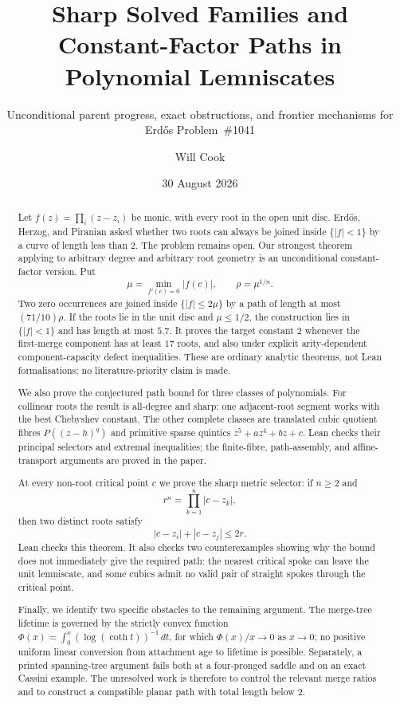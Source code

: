\documentclass[11pt]{article}
\title{Sharp Solved Families and\\Constant-Factor Paths in Polynomial Lemniscates}
\subtitle{Unconditional parent progress, exact obstructions, and frontier
mechanisms for Erd\H{o}s Problem~\#1041}
\author{Will Cook}
\date{30 August 2026}
\begin{document}
\maketitle
\noteprovenance

\begin{abstract}
\noindent
Let $f(z)=\prod_i(z-z_i)$ be monic, with every root in the open unit disc.
Erd\H{o}s, Herzog, and Piranian asked whether two roots can always be joined
inside $\{|f|<1\}$ by a curve of length less than $2$.  The problem remains
open.  Our strongest theorem applying to arbitrary degree and arbitrary root
geometry is an unconditional constant-factor version.  Put
\[
 \mu=\min_{f'(c)=0}|f(c)|,\qquad \rho=\mu^{1/n}.
\]
Two zero occurrences are joined inside $\{|f|\le2\mu\}$ by a path of length
at most $(71/10)\rho$.  If the roots lie in the unit disc and $\mu\le1/2$,
the construction lies in $\{|f|<1\}$ and has length at most $5.7$.
It proves the target constant $2$ whenever the first-merge component has at
least $17$ roots, and also under explicit arity-dependent component-capacity
defect inequalities.  These are ordinary analytic theorems, not Lean
formalisations; no literature-priority claim is made.

We also prove the conjectured path bound for three classes of polynomials.
For collinear roots the result is all-degree and sharp: one adjacent-root
segment works with the best Chebyshev constant.  The other complete classes
are translated cubic quotient fibres $P((z-h)^q)$ and primitive sparse
quintics $z^5+az^4+bz+c$.  Lean checks their principal selectors and extremal
inequalities; the finite-fibre, path-assembly, and affine-transport arguments
are proved in the paper.

At every non-root critical point $c$ we prove the sharp metric selector: if
$n\ge2$ and
\[
 r^n=\prod_{k=1}^n|c-z_k|,
\]
then two distinct roots satisfy
\[
 |c-z_i|+|c-z_j|\le2r.
\]
Lean checks this theorem.  It also checks two counterexamples showing why the
bound does not immediately give the required path: the nearest critical spoke
can leave the unit lemniscate, and some cubics admit no valid pair of straight
spokes through the critical point.

Finally, we identify two specific obstacles to the remaining argument.  The
merge-tree lifetime is governed by the strictly convex function
$\Phi(x)=\int_0^x(\log(\coth t))^{-1}\,dt$, for which
$\Phi(x)/x\to0$ as $x\to0$; no positive uniform linear conversion from
attachment age to lifetime is possible.  Separately, a printed spanning-tree
argument fails both at a four-pronged saddle and on an exact Cassini example.
The unresolved work is therefore to control the relevant merge ratios and to
construct a compatible planar path with total length below $2$.
\end{abstract}
\end{document}
